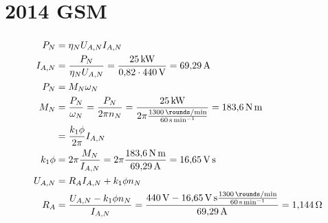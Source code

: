 \documentclass[11pt,a4paper]{scrartcl}
\newcommand{\0}{_{\mybr{0}}}
\newcommand{\1}{_{\mybr{1}}}
\newcommand{\2}{_{\mybr{2}}}
\begin{document}
\clearpage
\part{2014 GSM}
\section{}
\begin{align}
P_N&=\eta_N U_{A,N} I_{A,N}\\
I_{A,N}&=\frac{P_N}{\eta_N U_{A,N}}=\frac{\SI{25}{\kilo\watt}}{\num{0.82}\cdot\SI{440}{\volt}}=\SI{69.29}{\ampere}\\
P_N&=M_N\omega_N\\
M_N&=\frac{P_N}{\omega_N}=\frac{P_N}{2\pi n_N}=\frac{\SI{25}{\kilo\watt}}{2\pi \frac{\SI{1300}{\rounds\per\minute}}{\SI{60}{\second\per\minute}}}=\SI{183.6}{\newton\metre}\\
&=\frac{k_1\phi}{2\pi}I_{A,N}\\
k_1\phi&=2\pi \frac{M_N}{I_{A,N}}=2\pi\frac{\SI{183.6}{\newton\metre}}{\SI{69.29}{\ampere}}=\SI{16.65}{\volt\second}\\
U_{A,N}&=R_A I_{A,N} + k_1\phi n_N\\
R_A&=\frac{U_{A,N}-k_1\phi n_N}{I_{A,N}}=\frac{\SI{440}{\volt}-\SI{16.65}{\volt\second}\frac{\SI{1300}{\rounds\per\minute}}{\SI{60}{\second\per\minute}}}{\SI{69.29}{\ampere}}=\SI{1.144}{\ohm}
\end{align}
\end{document}
